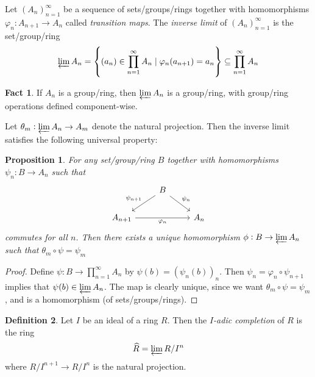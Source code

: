 \documentclass[11pt]{article}
\theoremstyle{definition}
\newtheorem{definition}{Definition}[subsection]
\newtheorem*{fact}{Fact}
\theoremstyle{plain}
\newtheorem{proposition}[definition]{Proposition}
\theoremstyle{remark}
\begin{document}
Let $(A_n)_{n=1}^\infty$ be a sequence of sets/groups/rings together with homomorphisms $\varphi_n : A_{n+1} \to A_n$ called \emph{transition maps}. The \emph{inverse limit} of $(A_n)_{n=1}^\infty$ is the set/group/ring
\begin{equation*}
    \varprojlim A_n = \left\{(a_n) \in \prod_{n=1}^\infty A_n \mid \varphi_n(a_{n+1}) = a_n\right\} \subseteq \prod_{n=1}^\infty A_n
\end{equation*}

\begin{fact}
    If $A_n$ is a group/ring, then $\varprojlim A_n$ is a group/ring, with group/ring operations defined component-wise.
\end{fact}

Let $\theta_m : \varprojlim A_n \to A_m$ denote the natural projection. Then the inverse limit satisfies the following universal property:

\begin{proposition}\label{prop:3_3}
    For any set/group/ring $B$ together with homomorphisms $\psi_n : B \to A_n$ such that
    \begin{equation*}
    \begin{tikzcd}
        & B \arrow[ld, "\psi_{n+1}"'] \arrow[rd, "\psi_n"] &\\
        A_{n+1} \arrow[rr, "\varphi_n"'] & & A_n
    \end{tikzcd}
    \end{equation*}
    commutes for all $n$. Then there exists a unique homomorphism $\phi : B \to \varprojlim A_n$ such that $\theta_m \circ \psi = \psi_m$
\end{proposition}
\begin{proof}
    Define $\psi : B \to \prod_{n=1}^\infty A_n$ by $\psi(b) = (\psi_n(b))_n$. Then $\psi_n = \varphi_n \circ \psi_{n+1}$ implies that $\psi(b) \in \varprojlim A_n$. The map is clearly unique, since we want $\theta_m \circ \psi = \psi_m$, and is a homomorphism (of sets/groups/rings).
\end{proof}

\begin{definition}
    Let $I$ be an ideal of a ring $R$. Then the \emph{$I$-adic completion} of $R$ is the ring
    \begin{equation*}
        \widehat{R} = \varprojlim R/I^n
    \end{equation*}
    where $R/I^{n+1} \to R/I^n$ is the natural projection.
\end{definition}
\end{document}
